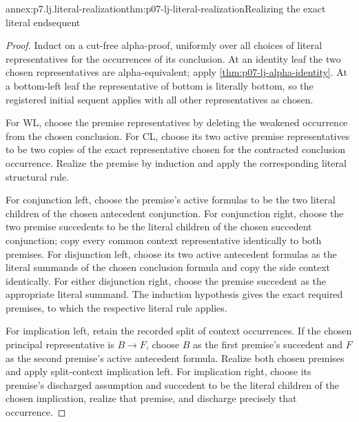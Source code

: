 \begin{annexitem}{annex:p7.lj.literal-realization}{thm:p07-lj-literal-realization}{Realizing the exact literal endsequent}
\begin{proof}
Induct on a cut-free alpha-proof, uniformly over all choices of literal
representatives for the occurrences of its conclusion.  At an identity
leaf the two chosen representatives are alpha-equivalent; apply
\ref{thm:p07-lj-alpha-identity}.  At a bottom-left leaf the representative
of bottom is literally bottom, so the registered initial sequent applies
with all other representatives as chosen.

For WL, choose the premise representatives by deleting the weakened
occurrence from the chosen conclusion.  For CL, choose its two active
premise representatives to be two copies of the exact representative
chosen for the contracted conclusion occurrence.  Realize the premise
by induction and apply the corresponding literal structural rule.

For conjunction left, choose the premise's active formulas to be the
two literal children of the chosen antecedent conjunction.  For
conjunction right, choose the two premise succedents to be the literal
children of the chosen succedent conjunction; copy every common context
representative identically to both premises.  For disjunction left,
choose its two active antecedent formulas as the literal summands of
the chosen conclusion formula and copy the side context identically.
For either disjunction right, choose the premise succedent as the
appropriate literal summand.  The induction hypothesis gives the exact
required premises, to which the respective literal rule applies.

For implication left, retain the recorded split of context occurrences.
If the chosen principal representative is \(B\to F\), choose
\(B\) as the first premise's succedent and \(F\) as the second
premise's active antecedent formula.  Realize both chosen premises
and apply split-context implication left.  For implication right,
choose its premise's discharged assumption and succedent to be the
literal children of the chosen implication, realize that premise,
and discharge precisely that occurrence.


\end{proof}
\end{annexitem}
